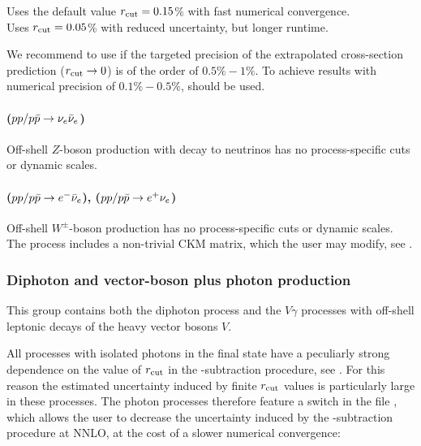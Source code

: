 \documentclass[english,11pt]{article}
\begin{document}
\quad Uses the default value $r_{\mathrm{cut}}{}=0.15$\% with fast numerical convergence.\\
\quad Uses $r_{\mathrm{cut}}{}=0.05$\% with reduced uncertainty, but longer runtime.

We recommend to use  if the targeted precision of the extrapolated cross-section prediction ($r_{\mathrm{cut}}\rightarrow0$) is of the order of $0.5\%-1\%$. To achieve results with numerical precision of $0.1\%-0.5\%$,  should be used.

\paragraph{ ($pp/p\bar{p}\to \nu_e\bar\nu_e$)}
Off-shell $Z$-boson production with decay to neutrinos has no process-specific cuts or dynamic scales.

\paragraph{ ($pp/p\bar{p}\to e^-\bar{\nu}_e$),  ($pp/p\bar{p}\to e^+\nu_e$)}

Off-shell $W^\pm$-boson production has no process-specific cuts or dynamic scales. The process includes a non-trivial CKM matrix, 
which the user may modify, see .


\subsubsection{Diphoton and vector-boson plus photon production}\label{sec:photonprocesses}

This group contains both the diphoton process and the $V\gamma$ processes with off-shell leptonic decays of the heavy vector bosons $V$. 

All processes with isolated photons in the final state have a peculiarly strong dependence on the value of $r_{\mathrm{cut}}{}$ in the \qt{}-subtraction procedure, see . 
For this reason the estimated uncertainty induced by finite $r_{\mathrm{cut}}{}$ values is particularly large in these processes. The photon processes therefore feature a switch
 in the file , which allows the user to decrease the uncertainty induced by the \qt{}-subtraction procedure at NNLO, at the cost of a slower numerical convergence:
\end{document}
